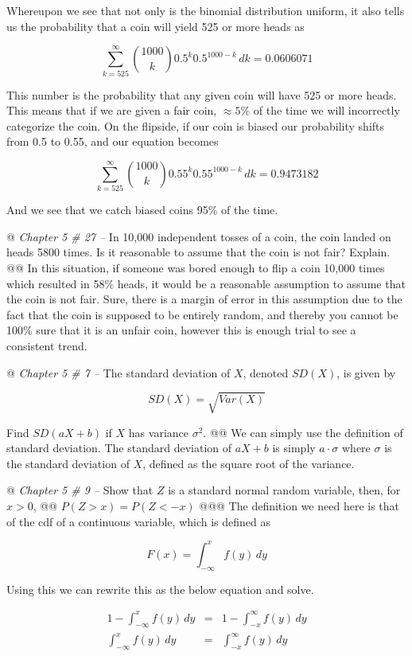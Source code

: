 \documentclass[10pt]{article}
\begin{document}
\begin{easylist}[enumerate]
    Whereupon we see that not only is the binomial distribution uniform, it also tells us the probability that a coin
    will yield 525 or more heads as

    \[ \sum^\infty_{k=525} \binom{1000}{k} 0.5^k {0.5}^{1000 - k} \, dk = 0.0606071 \]

    This number is the probability that any given coin will have 525 or more heads. This means that if we are given a
    fair coin, $\approx 5\%$ of the time we will incorrectly categorize the coin. On the flipside, if our coin is biased
    our probability shifts from 0.5 to 0.55, and our equation becomes

    \[ \sum^\infty_{k=525} \binom{1000}{k} 0.55^k {0.55}^{1000 - k} \, dk = 0.9473182 \]

    And we see that we catch biased coins 95\% of the time.

    @ \textit{Chapter 5 \# 27 --} In 10,000 independent tosses of a coin, the coin landed on heads 5800 times. Is it
    reasonable to assume that the coin is not fair? Explain.
    @@ In this situation, if someone was bored enough to flip a coin 10,000 times which resulted in 58\% heads, it would
    be a reasonable assumption to assume that the coin is not fair. Sure, there is a margin of error in this assumption
    due to the fact that the coin is supposed to be entirely random, and thereby you cannot be 100\% sure that it is an
    unfair coin, however this is enough trial to see a consistent trend.

    @ \textit{Chapter 5 \# 7 --} The standard deviation of $X$, denoted $SD(X)$, is given by

    \[
        SD(X) = \sqrt{Var(X)}
    \]

    Find $SD(aX + b)$ if $X$ has variance $\sigma^2$.
    @@ We can simply use the definition of standard deviation. The standard deviation of $aX + b$ is simply $a \cdot
    \sigma$ where $\sigma$ is the standard deviation of $X$, defined as the square root of the variance.

    @ \textit{Chapter 5 \# 9 --} Show that $Z$ is a standard normal random variable, then, for $x > 0$,
    @@ $P(Z > x) = P(Z < -x)$
    @@@ The definition we need here is that of the cdf of a continuous variable, which is defined as

    \[
        F(x) = \int^x_{-\infty} f(y) \, dy
    \]

    Using this we can rewrite this as the below equation and solve.

    \[
        \begin{aligned}
        1 - \int^x_{-\infty} f(y) \, dy &=& 1 - \int^\infty_{-x} f(y) \, dy\\
        \int^x_{-\infty} f(y) \, dy &=& \int^\infty_{-x} f(y) \, dy\\
        \end{aligned}
    \]


\end{easylist}
\end{document}
